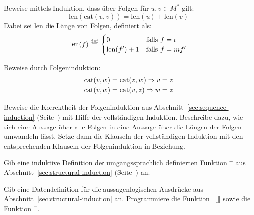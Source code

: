 \begin{aufgabe}
  Beweise mittels Induktion, dass über Folgen für 
  $u,v\in M^{\ast}$ gilt:
  \begin{displaymath}
    \mathrm{len}(\mathrm{cat}(u, v)) = \mathrm{len}(u) + \mathrm{len}(v)
  \end{displaymath}
  Dabei sei $\mathrm{len}$ die Länge von Folgen, definiert als:
  \begin{displaymath}
    \mathrm{len}(f) \stackrel{\rm def}{=}{}
    \begin{cases}
       0 & \textrm{falls $f = \epsilon$}\\
       \mathrm{len}(f') + 1 & \textrm{falls $f = mf'$}
    \end{cases}
  \end{displaymath}
\end{aufgabe}

\begin{aufgabe} Beweise durch Folgeninduktion:
  \begin{displaymath}
    \begin{split}
      {\rm cat}(v,w)&= {\rm cat}(z,w) \Rightarrow v=z\\
      {\rm cat}(v,w)&= {\rm cat}(v,z) \Rightarrow w=z
  \end{split}
\end{displaymath}
\end{aufgabe}

\begin{aufgabe}
  \label{aufgabe:folgeninduktion}
  Beweise die Korrektheit der Folgeninduktion aus
  Abschnitt~\ref{sec:sequence-induction} (Seite~\pageref{sec:sequence-induction}) mit
  Hilfe der vollständigen Induktion.  Beschreibe dazu, wie sich
  eine Aussage über alle Folgen in eine Aussage über die Längen der
  Folgen umwandeln lässt.  Setze dann die Klauseln der
  vollständigen Induktion mit den entsprechenden Klauseln der
  Folgeninduktion in Beziehung.
\end{aufgabe}

\begin{aufgabe}
  Gib eine induktive Definition der umgangssprachlich
  definierten Funktion $\overline{\raisebox{1ex}{\hspace{1ex}}}$ aus
  Abschnitt~\ref{sec:structural-induction}
  (Seite~\pageref{page:overline}) an.
\end{aufgabe}

\begin{aufgabe}
  Gib eine Datendefinition für die aussagenlogischen Ausdrücke
  aus Abschnitt~\ref{sec:structural-induction} an.  Programmiere
  die Funktion~$\llbracket\underline{~}\rrbracket$ sowie die Funktion 
  $\overline{\raisebox{1ex}{\hspace{1ex}}}$.
\end{aufgabe}

